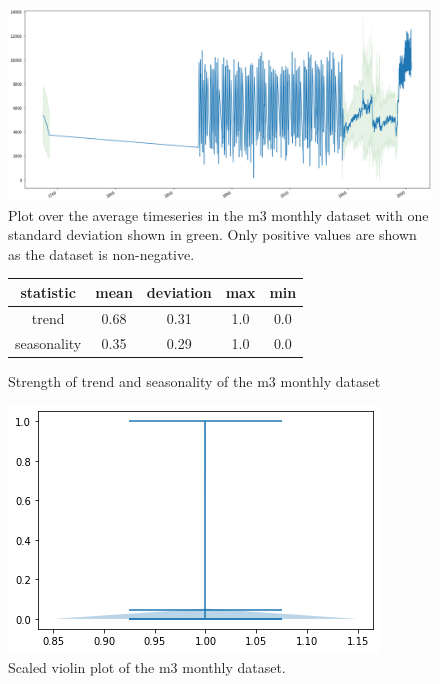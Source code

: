 \begin{figure}[htb]
    \centering
    \includegraphics[width=\linewidth]{./img/m3_monthly_plot.png}
    \caption{Plot over the average timeseries in the m3 monthly dataset with one standard deviation shown in green. Only positive values are shown as the dataset is non-negative.}
    \label{fig:m3_monthly_plot}
    \endminipage\hfill
\end{figure}

\begin{figure}[htb]
    \centering
    \begin{center}
        \begin{tabular}{||c | c | c | c | c |}
            \hline
            statistic   & mean & deviation & max & min \\
            \hline
            trend       & 0.68 & 0.31      & 1.0 & 0.0 \\
            \hline
            seasonality & 0.35 & 0.29      & 1.0 & 0.0 \\
            \hline
            \hline
        \end{tabular}
        \caption{Strength of trend and seasonality of the m3 monthly dataset}
    \end{center}
    \endminipage\hfill
    \includegraphics[width=\linewidth]{./img/m3_monthly_violin.png}
    \caption{Scaled violin plot of the m3 monthly dataset.}
    \label{fig:m3_monthly_violin}
    \endminipage\hfill
\end{figure}

